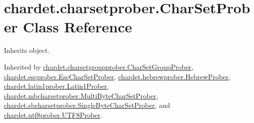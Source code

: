 \hypertarget{classchardet_1_1charsetprober_1_1_char_set_prober}{}\section{chardet.\+charsetprober.\+Char\+Set\+Prober Class Reference}
\label{classchardet_1_1charsetprober_1_1_char_set_prober}


Inherits object.



Inherited by \hyperlink{classchardet_1_1charsetgroupprober_1_1_char_set_group_prober}{chardet.\+charsetgroupprober.\+Char\+Set\+Group\+Prober}, \hyperlink{classchardet_1_1escprober_1_1_esc_char_set_prober}{chardet.\+escprober.\+Esc\+Char\+Set\+Prober}, \hyperlink{classchardet_1_1hebrewprober_1_1_hebrew_prober}{chardet.\+hebrewprober.\+Hebrew\+Prober}, \hyperlink{classchardet_1_1latin1prober_1_1_latin1_prober}{chardet.\+latin1prober.\+Latin1\+Prober}, \hyperlink{classchardet_1_1mbcharsetprober_1_1_multi_byte_char_set_prober}{chardet.\+mbcharsetprober.\+Multi\+Byte\+Char\+Set\+Prober}, \hyperlink{classchardet_1_1sbcharsetprober_1_1_single_byte_char_set_prober}{chardet.\+sbcharsetprober.\+Single\+Byte\+Char\+Set\+Prober}, and \hyperlink{classchardet_1_1utf8prober_1_1_u_t_f8_prober}{chardet.\+utf8prober.\+U\+T\+F8\+Prober}.

